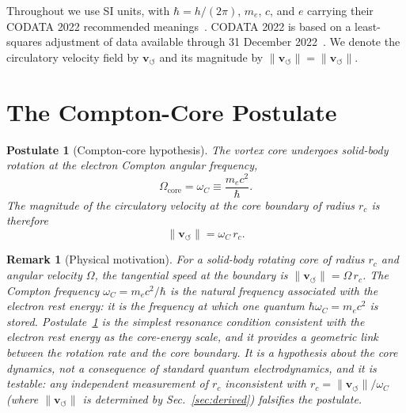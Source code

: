 \documentclass[aps,pra,preprint,longbibliography,nofootinbib]{revtex4-2}
\newtheorem{postulate}{Postulate}
\newtheorem{remark}{Remark}
\newcommand{\vnorm}{\lVert\mathbf{v}_{\!\boldsymbol{\circlearrowleft}}\rVert} %
\newcommand{\rc}{r_c}                            %
\newcommand{\omC}{\omega_C}                      %
\begin{document}
Throughout we use SI units, with $\hbar=h/(2\pi)$, $m_e$, $c$, and $e$
carrying their CODATA 2022 recommended meanings~\cite{MohrTaylor2022}.
CODATA 2022 is based on a least-squares adjustment of data available
through 31 December 2022~\cite{MohrTaylor2022}.  We denote the
circulatory velocity field by $\mathbf{v}_{\!\boldsymbol{\circlearrowleft}}$
and its magnitude by
$\vnorm=\lVert \mathbf{v}_{\!\boldsymbol{\circlearrowleft}}\rVert$.

\section{The Compton-Core Postulate}
\label{sec:postulate}

\begin{postulate}[Compton-core hypothesis]
\label{post:compton}
The vortex core undergoes solid-body rotation at the electron
Compton angular frequency,
\begin{equation}
  \Omega_{\mathrm{core}} = \omC \equiv \frac{m_e c^2}{\hbar}.
  \label{eq:postulate}
\end{equation}
The magnitude of the circulatory velocity at the core boundary
of radius $\rc$ is therefore
\begin{equation}
  \vnorm = \omC\,\rc.
  \label{eq:vc_rc_link}
\end{equation}
\end{postulate}

\begin{remark}[Physical motivation]
\label{rem:motivation}
For a solid-body rotating core of radius $\rc$ and angular
velocity $\Omega$, the tangential speed at the boundary is
$\vnorm = \Omega\,\rc$.
The Compton frequency $\omC = m_e c^2/\hbar$ is the natural
frequency associated with the electron rest energy: it is the
frequency at which one quantum $\hbar\omC = m_e c^2$ is stored.
Postulate~\ref{post:compton} is the simplest resonance condition
consistent with the electron rest energy as the core-energy scale,
and it provides a geometric link between the rotation rate and the
core boundary.
It is a hypothesis about the core dynamics, not a consequence of
standard quantum electrodynamics, and it is testable: any
independent measurement of $\rc$ inconsistent with
$\rc = \vnorm/\omC$ (where $\vnorm$ is determined by
Sec.~\ref{sec:derived}) falsifies the postulate.
\end{remark}
\end{document}
